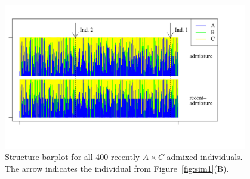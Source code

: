 \documentclass[12pt]{article}
\theoremstyle{definition}
\begin{document}
\begin{figure}[H]
  \begin{center}
    \parbox[b]{0.9\textwidth}{\includegraphics[width=0.95\textwidth]{abc_StructurePlot.pdf}\vspace{-2cm}}
  \end{center}
  \caption{\label{Sfig:sim2} Structure barplot for all 400 recently
    $A\times C$-admixed individuals. The arrow indicates the
    individual from Figure~\ref{fig:sim1}(B).}
\end{figure}
\end{document}
